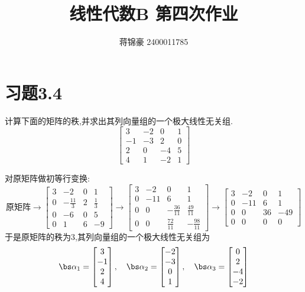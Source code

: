\documentclass{ctexart}
\title{线性代数B  第四次作业}
\author{蒋锦豪 2400011785}
\date{}
\begin{document}
\maketitle
\section*{习题3.4}
\begin{homework}[1(1)]
    计算下面的矩阵的秩,并求出其列向量组的一个极大线性无关组.
    \[\begin{bmatrix}
        3&-2&0&1\\
        -1&-3&2&0\\
        2&0&-4&5\\
        4&1&-2&1
    \end{bmatrix}\]
\end{homework}
\begin{solution}
    对原矩阵做初等行变换:
    \[\text{原矩阵}\longrightarrow\begin{bmatrix}
        3&-2&0&1\\
        0&-\frac{11}{3}&2&\frac{1}{3}\\
        0&-6&0&5\\
        0&1&6&-9
    \end{bmatrix}\longrightarrow\begin{bmatrix}
        3&-2&0&1\\
        0&-11&6&1\\
        0&0&-\frac{36}{11}&\frac{49}{11}\\
        0&0&\frac{72}{11}&-\frac{98}{11}
    \end{bmatrix}\longrightarrow\begin{bmatrix}
        3&-2&0&1\\
        0&-11&6&1\\
        0&0&36&-49\\
        0&0&0&0
    \end{bmatrix}\]
    于是原矩阵的秩为$3$,其列向量组的一个极大线性无关组为
    \[\bs\alpha_1=\begin{bmatrix}
        3\\-1\\2\\4
    \end{bmatrix},\quad\bs\alpha_2=\begin{bmatrix}
        -2\\-3\\0\\1
    \end{bmatrix},\quad\bs\alpha_3=\begin{bmatrix}
        0\\2\\-4\\-2
    \end{bmatrix}\]
\end{solution}
\end{document}
